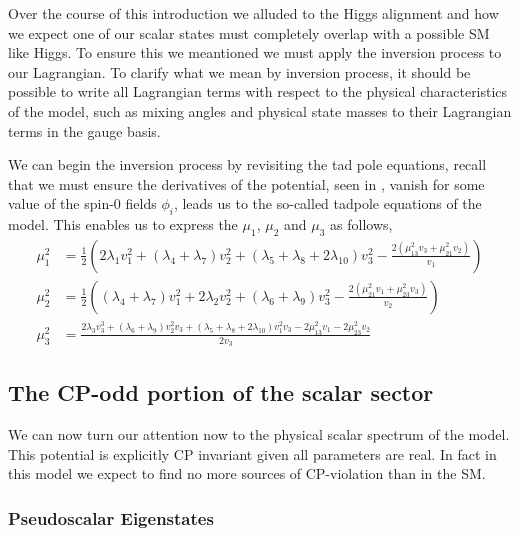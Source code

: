 Over the course of this introduction we alluded to the Higgs alignment and how we expect one of our scalar states must completely overlap with a possible SM like Higgs. 
%
To ensure this we meantioned we must apply the inversion process to our Lagrangian. 
%
To clarify what we mean by inversion process, it should be possible to write all Lagrangian terms with respect to the physical characteristics of the model, such as mixing angles and physical state masses to their Lagrangian terms in the gauge basis. 

We can begin the inversion process by revisiting the tad pole equations, recall that we must ensure the derivatives of the potential, seen in \Joaoadd{\eqref{eq:3HDM_tadpoles}}, vanish for some value of the spin-0 fields $\phi_i$, leads us to the so-called tadpole equations of the model. This enables us to express the $\mu_1$, $\mu_2$ and $\mu_3$ as follows, 
%
\begin{equation}
\label{eq:3HDM_Param_1}
\begin{split}
%
\mu _1^2& =\frac{1}{2} \left(2 \lambda _1 v_1^2+\left(\lambda _4+\lambda _7\right) v_2^2+\left(\lambda _5+\lambda _8+2 \lambda _{10}\right) v_3^2-\frac{2 \left(\mu _{13}^2 v_3+\mu _{21}^2
   v_2\right)}{v_1}\right) \\ 
%
\mu _2^2 & =\frac{1}{2} \left(\left(\lambda _4+\lambda _7\right) v_1^2+2 \lambda _2 v_2^2+\left(\lambda _6+\lambda _9\right) v_3^2-\frac{2 \left(\mu _{21}^2 v_1+\mu _{23}^2 v_3\right)}{v_2}\right) \\ 
% 
\mu _3^2 & =\frac{2 \lambda _3 v_3^3+\left(\lambda _6+\lambda _9\right) v_2^2 v_3+\left(\lambda _5+\lambda _8+2 \lambda _{10}\right) v_1^2 v_3-2 \mu _{13}^2 v_1-2 \mu _{23}^2 v_2}{2 v_3}
\end{split}  
\end{equation}

\subsection{The CP-odd portion of the scalar sector}

We can now turn our attention now to the physical scalar spectrum of the model. 
%
This potential is explicitly CP invariant given all parameters are real.
%
In fact in this model we expect to find no more sources of CP-violation than in the SM. 

\subsubsection{Pseudoscalar Eigenstates}

